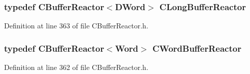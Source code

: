 \subsubsection{\setlength{\rightskip}{0pt plus 5cm}typedef {\bf CBuffer\-Reactor}$<$DWord$>$ CLong\-Buffer\-Reactor}\label{CBufferReactor_8h_a2}




Definition at line 363 of file CBuffer\-Reactor.h.
\subsubsection{\setlength{\rightskip}{0pt plus 5cm}typedef {\bf CBuffer\-Reactor}$<$Word$>$ CWord\-Buffer\-Reactor}\label{CBufferReactor_8h_a1}




Definition at line 362 of file CBuffer\-Reactor.h.